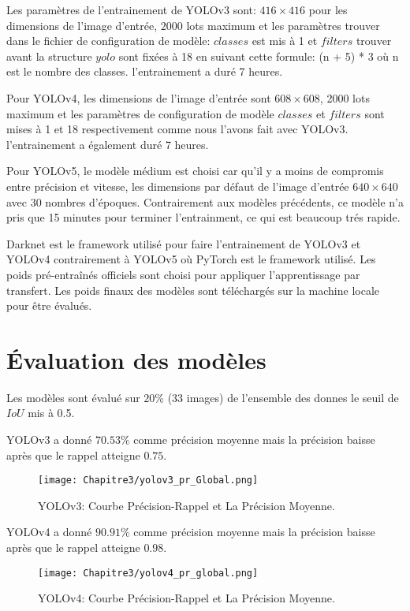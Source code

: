      Les paramètres de l'entrainement de YOLOv3 sont: $416\times416$ pour les dimensions de l'image d'entrée, $2000$ lots maximum et les paramètres trouver dans le fichier de configuration de modèle: $classes$ est mis à 1 et $filters$ trouver avant la structure $yolo$ sont fixées à 18 en suivant cette formule: (n + 5) * 3 où n est le nombre des classes. l'entrainement a duré 7 heures.
     
     Pour YOLOv4, les dimensions de l'image d'entrée sont $608\times608$, 2000 lots maximum et les paramètres de configuration de modèle $classes$ et $filters$ sont mises à 1 et 18 respectivement comme nous l'avons fait avec YOLOv3. l'entrainement a également duré 7 heures.
     
     Pour YOLOv5, le modèle médium est choisi car qu'il y a moins de compromis entre précision et vitesse, les dimensions par défaut de l'image d'entrée $640\times640$ avec 30 nombres d'époques. Contrairement aux modèles précédents, ce modèle n'a pris que 15 minutes pour terminer l'entrainment, ce qui est beaucoup trés rapide.

     Darknet est le framework utilisé pour faire l'entrainement de YOLOv3 et YOLOv4 contrairement à YOLOv5 où PyTorch est le framework utilisé. Les poids pré-entraînés officiels sont choisi pour appliquer l'apprentissage par transfert. Les poids finaux des modèles sont téléchargés sur la machine locale pour être évalués.
     

\section{Évaluation des modèles}
     Les modèles sont évalué sur $20\%$ (33 images) de l'ensemble des donnes le seuil de $IoU$ mis à 0.5.
     
     YOLOv3 a donné $70.53\%$ comme précision moyenne mais la précision baisse après que le rappel atteigne $0.75$.
     
     \begin{figure}[H]
               \centering
               \texttt{[image: Chapitre3/yolov3\_pr\_Global.png]}
               \caption{YOLOv3: Courbe Précision-Rappel et La Précision Moyenne.}
               \label{y3_pr}
               \end{figure}

     YOLOv4 a donné $90.91\%$ comme précision moyenne mais la précision baisse après que le rappel atteigne $0.98$.
     \begin{figure}[H]
               \centering
               \texttt{[image: Chapitre3/yolov4\_pr\_global.png]}
               \caption{YOLOv4: Courbe Précision-Rappel et La Précision Moyenne.}
               \label{y4_pr}
               \end{figure}

